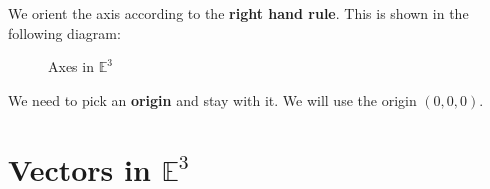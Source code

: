 We orient the axis according to the \textbf{right hand rule}. This is shown in the following diagram:


\begin{figure}[H]
  \centering
  \caption{Axes in $\mathbb{E}^3$}
\end{figure}

\begin{note}
  We need to pick an \textbf{origin} and stay with it. We will use the origin $(0,0,0)$.
\end{note} 

\clearpage
\section{Vectors in $\mathbb{E}^3$}

